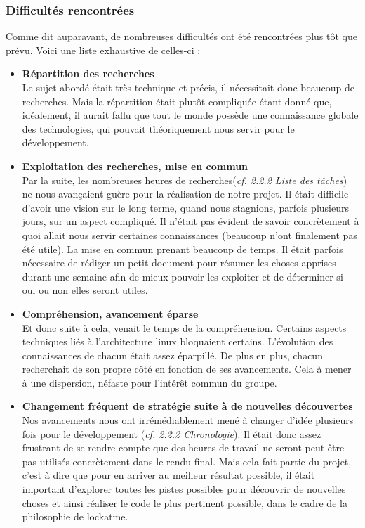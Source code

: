 \documentclass[french]{report}
\begin{document}
\subsubsection{Difficultés rencontrées}
Comme dit auparavant, de nombreuses difficultés ont été rencontrées plus tôt que prévu.
Voici une liste exhaustive de celles-ci :

\vspace{0.5cm}
\begin{itemize}[label=\textbullet, font=\normalfont \color{blue}]
  \item{\textbf{Répartition des recherches}}\\
Le sujet abordé était très technique et précis, il nécessitait donc beaucoup de
recherches. Mais la répartition était plutôt compliquée étant donné que, idéalement,
il aurait fallu que tout le monde possède une connaissance globale des technologies,
qui pouvait théoriquement nous servir pour le développement.\\

  \item{\textbf{Exploitation des recherches, mise en commun}}\\
Par la suite, les nombreuses heures de recherches(\emph{cf. 2.2.2 Liste des tâches}) ne nous avançaient guère pour la
réalisation de notre projet. Il était difficile d'avoir une vision sur le long
terme, quand nous stagnions, parfois plusieurs jours, sur un aspect compliqué. Il
n'était pas évident de savoir concrètement à quoi allait nous servir certaines
connaissances (beaucoup n'ont finalement pas été utile). La mise
en commun prenant beaucoup de temps. Il était parfois nécessaire de rédiger un
petit document pour résumer les choses apprises durant une semaine afin de mieux
pouvoir les exploiter et de déterminer si oui ou non elles seront utiles.\\

  \item{\textbf{Compréhension, avancement éparse}}\\
Et donc suite à cela, venait le temps de la compréhension. Certains aspects techniques
liés à l'architecture linux bloquaient certains. L'évolution des connaissances de
chacun était assez éparpillé. De plus en plus, chacun recherchait de son propre
côté en fonction de ses avancements. Cela à mener à une dispersion, néfaste pour
l'intérêt commun du groupe.\\

  \item{\textbf{Changement fréquent de stratégie suite à de nouvelles découvertes}}\\
Nos avancements nous ont irrémédiablement mené à changer d'idée plusieurs fois
pour le développement (\emph{cf. 2.2.2 Chronologie}). Il était donc assez
frustrant de se rendre compte que des heures de travail ne seront peut être pas
utilisés concrètement dans le rendu final. Mais cela fait partie du projet,
c'est à dire que pour en arriver au meilleur résultat possible, il était important
d'explorer toutes les pistes possibles pour découvrir de nouvelles choses et ainsi
réaliser le code le plus pertinent possible, dans le cadre de la philosophie de lockatme.\\


\end{itemize}
\end{document}
